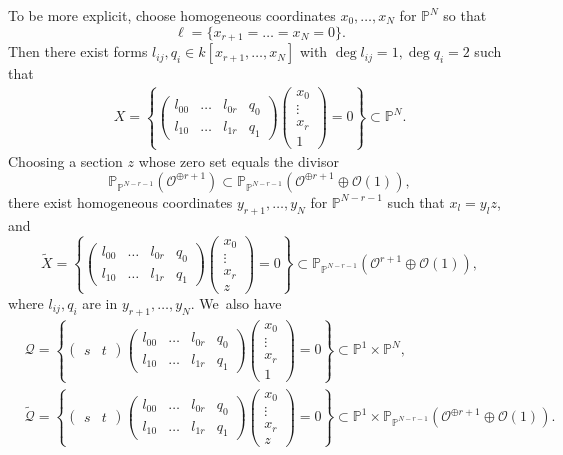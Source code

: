 \documentclass[JEP,XML,SOM,Unicode,NoEqCountersInSection,published]{cedram}
\theoremstyle{plain}
\theoremstyle{definition}
\renewcommand\P{\mathbb{P}}
\renewcommand\O{\mathcal{O}}
\begin{document}
To be more explicit, choose homogeneous coordinates $x_0,\dots, x_{N}$ for $\P^{N}$ so that
\[
\ell=\bigl\{x_{r+1}=\dots= x_{N}=0\bigr\}.
\]
Then there exist forms $l_{ij}, q_i\in k[x_{r+1}, \dots, x_{N}]$ with $\deg l_{ij}=1, \deg q_i =2$ such that
\begin{align*}
X
=\left\{
\begin{pmatrix}
l_{00} & \dots &l_{0r} & q_0\\
l_{10} & \dots & l_{1r} & q_1
\end{pmatrix}
\begin{pmatrix}
x_0\\[-3pt]
\vdots\\[-3pt]
x_r\\
1
\end{pmatrix}
=0
\right\}
\subset \P^{N}.
\end{align*}
Choosing a section $z$ whose zero set equals the divisor
\[
\P_{\P^{N-r-1}}(\O^{\oplus r+1})\subset \P_{\P^{N-r-1}}(\O^{\oplus r+1 }\oplus \O(1)),
\]
there exist homogeneous coordinates $y_{r+1},\dots, y_{N}$ for $\P^{N-r-1}$ such that $x_l = y_l z$,
and
\[
\widetilde{X}=
\left\{
\begin{pmatrix}
l_{00} & \dots &l_{0r} & q_0\\
l_{10} & \dots & l_{1r} & q_1
\end{pmatrix}
\begin{pmatrix}
x_0\\[-3pt]
\vdots\\[-3pt]
x_r\\
z
\end{pmatrix}
=0
\right\}\subset \P_{\P^{N-r-1}}(\O^{r+1}\oplus \O(1)),
\]
where $l_{ij}, q_i$ are in $y_{r+1},\dots, y_{N}$. We~also have
\begin{align*}
&\mathcal{Q}
=\left\{
\begin{pmatrix}
s & t
\end{pmatrix}
\begin{pmatrix}
l_{00} & \dots &l_{0r} & q_0\\
l_{10} & \dots & l_{1r} & q_1
\end{pmatrix}
\begin{pmatrix}
x_0\\[-3pt]
\vdots\\[-3pt]
x_r\\
1
\end{pmatrix}
=0
\right\}
\subset \P^1\times \P^{N},\\
&\widetilde{\mathcal{Q}}=
\left\{
\begin{pmatrix}
s & t
\end{pmatrix}
\begin{pmatrix}
l_{00} & \dots &l_{0r} & q_0\\
l_{10} & \dots & l_{1r} & q_1
\end{pmatrix}
\begin{pmatrix}
x_0\\[-3pt]
\vdots\\[-3pt]
x_r\\
z
\end{pmatrix}
=0
\right\}\subset \P^1\times \P_{\P^{N-r-1}}(\O^{\oplus r+1}\oplus \O(1)).
\end{align*}
\end{document}
